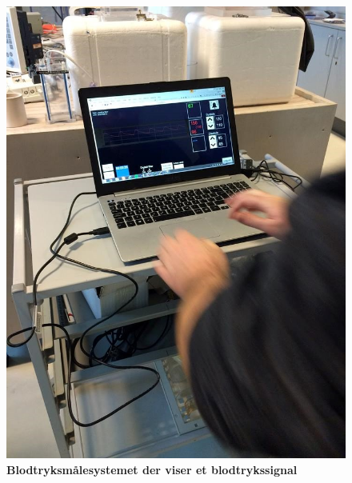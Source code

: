 \begin{figure}[htb]
  \begin{minipage}{0.45\textwidth}
    \centering
      \includegraphics[width=\textwidth]{billeder/integrationstest_opstilling}
      \caption{\textbf{Blodtryksmålesystemet der viser et blodtrykssignal}}
    \label{fig:figur1}
  \end{minipage}
  \hspace{0.1\textwidth}
  \begin{minipage}{0.45\textwidth}
    \centering

\end{minipage}
\end{figure}
